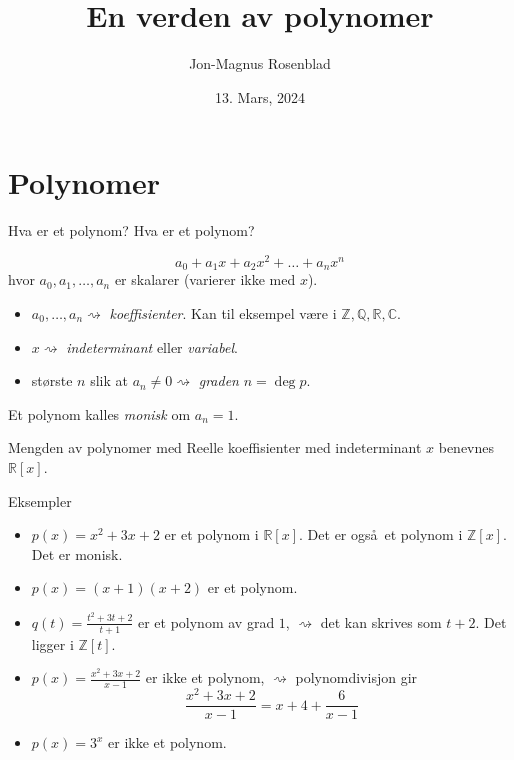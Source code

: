 \documentclass[norsk]{beamer}
\title{En verden av polynomer}
\author{Jon-Magnus Rosenblad}
\date{13. Mars, 2024}
\theoremstyle{example}
\begin{document}
\frame{\titlepage}

\frame{\tableofcontents}

\section{Polynomer}

\begin{frame}{Hva er et polynom?}
    Hva er et polynom?
    \begin{definition}
        \[
            a_0 + a_1 x + a_2 x^2 + \dots + a_n x^n
        \]
        hvor $a_0, a_1, \dots, a_n$ er skalarer (varierer ikke med $x$).

        \begin{itemize}
            \item $a_0,\dots, a_n\rightsquigarrow$ \textit{koeffisienter}.
                Kan til eksempel være i $\mathbb Z, \mathbb Q, \mathbb R, \mathbb C$.
            \item $x\rightsquigarrow$ \textit{indeterminant} eller \textit{variabel}.
            \item største $n$ slik at $a_n\neq 0\rightsquigarrow$
                \textit{graden} $n = \deg p$.
        \end{itemize}

        Et polynom kalles \textit{monisk} om $a_n = 1$.

        Mengden av polynomer med Reelle koeffisienter med indeterminant $x$
        benevnes $\mathbb R[x]$.
    \end{definition}
\end{frame}

\begin{frame}{Eksempler}
    \begin{example}
        \begin{itemize}
            \item $p(x) = x^2 + 3x + 2$ er et polynom i $\mathbb R[x]$.
                Det er også et polynom i $\mathbb Z[x]$.
                Det er monisk.
            \item $p(x) = (x + 1)(x + 2)$ er et polynom.
            \item $q(t) = \frac {t^2 + 3t + 2}{t + 1}$ er et polynom av grad $1$,
                $\rightsquigarrow$ det kan skrives som $t + 2$.
                Det ligger i $\mathbb Z[t]$.
        \end{itemize}
    \end{example}
    \begin{example}
        \begin{itemize}
            \item $p(x) = \frac{x^2 + 3x + 2}{x - 1}$ er ikke et polynom,
                $\rightsquigarrow$ polynomdivisjon gir
                \[
                    \frac {x^2 + 3x + 2}{x - 1} = x + 4 + \frac 6 {x - 1}
                \]
            \item $p(x) = 3^x$ er ikke et polynom.
        \end{itemize}
    \end{example}
\end{frame}
\end{document}
